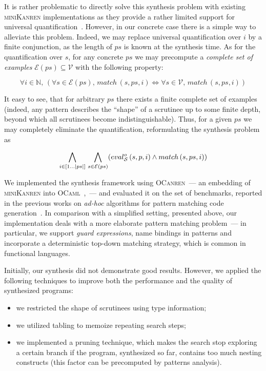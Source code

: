  It is rather problematic to directly solve this synthesis problem with existing \textsc{miniKanren} implementations as
 they provide a rather limited support for universal quantification~\cite{eigen,moiseenko}. However, in our concrete
 case there is a simple way to alleviate this problem. Indeed, we may replace universal quantification over $i$ by
 a finite conjunction, as the length of $ps$ is known at the synthesis time. As for the quantification over $s$, for
 any concrete $ps$ we may precompute a \emph{complete set of examples} $\mathcal{E}(ps)\subseteq\mathcal{V}$ with the following
 property:
 
 \[
 \forall i\in\mathbb{N},\,(\forall s\in\mathcal{E}(ps),\,match\, (s, ps, i) \Leftrightarrow \forall s\in\mathcal{V},\,match\, (s, ps, i))
 \]
 
 It easy to see, that for arbitrary $ps$ there exists a finite complete set of examples (indeed, any pattern describes the ``shape''
 of a scrutinee up to some finite depth, beyond which all scrutinees become indistinguishable). Thus, for a given $ps$ we may
 completely eliminate the quantification, reformulating the synthesis problem as
 
 \[
 \bigwedge_{i\in[1\dots|ps|]}\,\bigwedge_{s\in\mathcal{E}(ps)} (eval^o_{\mathcal{S}}\, (s, p, i) \wedge match\, (s, ps, i))
 \]
 
 We implemented the synthesis framework using \textsc{OCanren}~--- an embedding of \textsc{miniKanren} into \textsc{OCaml}~\cite{ocanren},~---
 and evaluated it on the set of benchmarks, reported in the previous works on \emph{ad-hoc} algorithms for pattern matching
 code generation~\cite{maranget2001,maranget2008}. In comparison with a simplified setting, presented above, our implementation
 deals with a more elaborate pattern matching problem~--- in particular, we support \emph{guard expressions}, name bindings in
 patterns and incorporate a deterministic top-down matching strategy, which is common in functional languages.
 
 Initially, our synthesis did not demonstrate good results. However, we applied the following techniques to improve both the performance
 and the quality of synthesized programs:
 
 \begin{itemize}
 \item we restricted the shape of scrutinees using type information;
 \item we utilized tabling to memoize repeating search steps;
 \item we implemented a pruning technique, which makes the search stop exploring a certain branch if the program, synthesized so far,
   contains too much nesting constructs (this factor can be precomputed by patterns analysis).
 \end{itemize}
 
